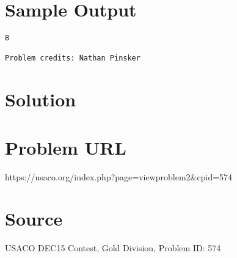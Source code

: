 \documentclass[12pt]{article}
\begin{document}
\section*{Sample Output}
\begin{verbatim}
8

Problem credits: Nathan Pinsker
\end{verbatim}

\section*{Solution}


\section*{Problem URL}
https://usaco.org/index.php?page=viewproblem2&cpid=574

\section*{Source}
USACO DEC15 Contest, Gold Division, Problem ID: 574
\end{document}
